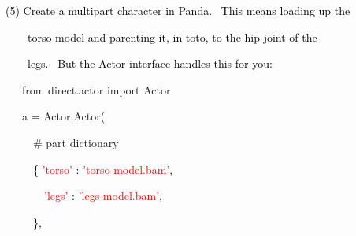 \documentclass[a4paper]{article}
\newcommand\textstyleOOoComputerKeyWord[1]{\textrm{\textcolor[rgb]{0.0,0.0,0.5019608}{#1}}}
\newcommand\textstyleOOoComputerIdent[1]{\textrm{\textcolor[rgb]{0.0,0.5019608,0.0}{#1}}}
\newcommand\textstyleOOoComputerBase[1]{\textrm{\textcolor{black}{#1}}}
\newcommand\textstyleOOoComputerLiteral[1]{\textrm{\textcolor{red}{#1}}}
\newcommand\textstyleOOoComputerComment[1]{\textrm{\textcolor[rgb]{0.29803923,0.29803923,0.29803923}{#1}}}
\begin{document}
{\color{black}
\textstyleOOoComputerKeyWord{\textcolor{black}{(5) Create a multipart character in Panda. \ This means loading up the}}}

{\color{black}
\textstyleOOoComputerKeyWord{\textcolor{black}{\ \ \ \ torso model and parenting it, in toto, to the hip joint of the}}}

{\color{black}
\textstyleOOoComputerKeyWord{\textcolor{black}{\ \ \ \ legs. \ But the Actor interface handles this for you:}}}


\bigskip

{\color{black}
\textstyleOOoComputerKeyWord{\textcolor{black}{\ \ \ }}\textstyleOOoComputerKeyWord{from}\textstyleOOoComputerKeyWord{\textcolor{black}{
}}\textstyleOOoComputerIdent{direct}\textstyleOOoComputerBase{.}\textstyleOOoComputerIdent{actor}\textstyleOOoComputerKeyWord{\textcolor{black}{
}}\textstyleOOoComputerKeyWord{import}\textstyleOOoComputerKeyWord{\textcolor{black}{
}}\textstyleOOoComputerIdent{Actor}}


\bigskip

{\color{black}
\textstyleOOoComputerKeyWord{\textcolor{black}{\ \ \ }}\textstyleOOoComputerIdent{a}\textstyleOOoComputerKeyWord{\textcolor{black}{
}}\textstyleOOoComputerBase{=}\textstyleOOoComputerKeyWord{\textcolor{black}{
}}\textstyleOOoComputerIdent{Actor}\textstyleOOoComputerBase{.}\textstyleOOoComputerIdent{Actor}\textstyleOOoComputerBase{(}}

{\color{black}
\textstyleOOoComputerKeyWord{\textcolor{black}{\ \ \ \ \ }}\textstyleOOoComputerComment{\# part dictionary}}

{\color{black}
\textstyleOOoComputerKeyWord{\textcolor{black}{\ \ \ \ \ }}\textstyleOOoComputerBase{\{}\textstyleOOoComputerKeyWord{\textcolor{black}{
}}\textstyleOOoComputerLiteral{{}'torso'}\textstyleOOoComputerKeyWord{\textcolor{black}{
}}\textstyleOOoComputerBase{:}\textstyleOOoComputerKeyWord{\textcolor{black}{
}}\textstyleOOoComputerLiteral{{}'torso-model.bam'}\textstyleOOoComputerBase{,}}

{\color{black}
\textstyleOOoComputerKeyWord{\textcolor{black}{\ \ \ \ \ \ \ }}\textstyleOOoComputerLiteral{{}'legs'}\textstyleOOoComputerKeyWord{\textcolor{black}{
}}\textstyleOOoComputerBase{:}\textstyleOOoComputerKeyWord{\textcolor{black}{
}}\textstyleOOoComputerLiteral{{}'legs-model.bam'}\textstyleOOoComputerBase{,}}

{\color{black}
\textstyleOOoComputerKeyWord{\textcolor{black}{\ \ \ \ \ }}\textstyleOOoComputerBase{\},}}


\bigskip
\end{document}

